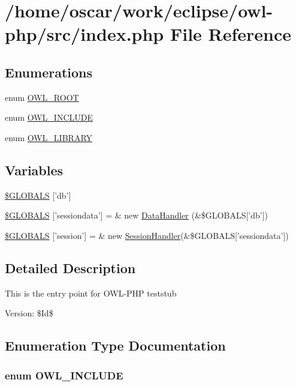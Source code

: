 \hypertarget{index_8php}{
\section{/home/oscar/work/eclipse/owl-php/src/index.php File Reference}
\label{index_8php}
}
\subsection*{Enumerations}
\begin{CompactItemize}
\item 
enum \hyperlink{index_8php_35612f9a6bd7277982731a74593272c4}{OWL\_\-ROOT} 
\item 
enum \hyperlink{index_8php_4d33a8f2fcc9c83cbeea921c4cb23a7f}{OWL\_\-INCLUDE} 
\item 
enum \hyperlink{index_8php_74eed08508c8b70677c4167acf49e427}{OWL\_\-LIBRARY} 
\end{CompactItemize}
\subsection*{Variables}
\begin{CompactItemize}
\item 
\hyperlink{index_8php_14159e18d9b64fd1e16054f784eda311}{\$GLOBALS} \mbox{[}'db'\mbox{]}
\item 
\hyperlink{index_8php_df2bd79dcae941587d8b69d6ece9104a}{\$GLOBALS} \mbox{[}'sessiondata'\mbox{]} = \& new \hyperlink{classDataHandler}{DataHandler} (\&\$GLOBALS\mbox{[}'db'\mbox{]})
\item 
\hyperlink{index_8php_95ec104c636100b9022c09964e2b0725}{\$GLOBALS} \mbox{[}'session'\mbox{]} = \& new \hyperlink{classSessionHandler}{SessionHandler}(\&\$GLOBALS\mbox{[}'sessiondata'\mbox{]})
\end{CompactItemize}


\subsection{Detailed Description}
This is the entry point for OWL-PHP teststub \begin{Desc}
\item[Version:]\$Id\$ \end{Desc}


\subsection{Enumeration Type Documentation}
\hypertarget{index_8php_4d33a8f2fcc9c83cbeea921c4cb23a7f}{
\subsubsection{\setlength{\rightskip}{0pt plus 5cm}enum {\bf OWL\_\-INCLUDE}}}
\label{index_8php_4d33a8f2fcc9c83cbeea921c4cb23a7f}


